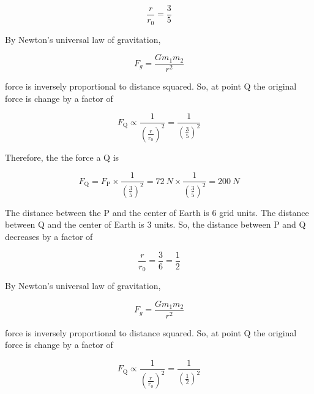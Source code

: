 \documentclass[answers]{exam}
\begin{document}
\begin{questions}
\begin{solutionorbox}[7cm]
    \begin{equation*}
        \frac{r}{r_0} = \frac{3}{5}
    \end{equation*}
    
    By Newton's universal law of gravitation,
    
    \begin{equation*}
        F_g = \frac{Gm_1 m_2}{r^2}
    \end{equation*}
    
    force is inversely proportional to distance squared. So, at point Q the original force is change by a factor of 
    
    \begin{equation*}
        F_\mathrm{Q} \propto \frac{1}{\left(\displaystyle \frac{r}{r_0}\right)^2} = \frac{1}{\left(\displaystyle \frac{3}{5}\right)^2}
    \end{equation*}
    
    Therefore, the the force a Q is
    
    \begin{equation*}
        F_\mathrm{Q} = F_\mathrm{P} \times \frac{1}{\left(\displaystyle \frac{3}{5}\right)^2} = \SI{72}{N} \times \frac{1}{\left(\displaystyle \frac{3}{5}\right)^2} = \boxed{\SI{200}{N}}
    \end{equation*}
    \end{solutionorbox}
\else
    \begin{solutionorbox}[10cm]
    The distance between the P and the center of Earth is 6 grid units. The distance between Q and the center of Earth is 3 units. So, the distance between P and Q decreases by a factor of 
    
    \begin{equation*}
        \frac{r}{r_0} = \frac{3}{6} = \frac{1}{2}
    \end{equation*}
    
    By Newton's universal law of gravitation,
    
    \begin{equation*}
        F_g = \frac{Gm_1 m_2}{r^2}
    \end{equation*}
    
    force is inversely proportional to distance squared. So, at point Q the original force is change by a factor of 
    
    \begin{equation*}
        F_\mathrm{Q} \propto \frac{1}{\left(\displaystyle \frac{r}{r_0}\right)^2} = \frac{1}{\left(\displaystyle \frac{1}{2}\right)^2}
    \end{equation*}
    

\end{solutionorbox}
\end{questions}
\end{document}
